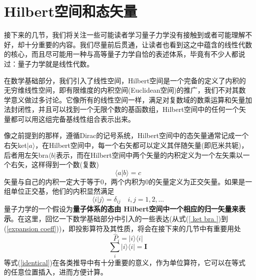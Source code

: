 \documentclass[12pt,a4paper,openany,twoside]{book}
\numberwithin{equation}{section}
\begin{document}
  \section{Hilbert空间和态矢量}
  接下来的几节，我们将关注一些可能读者学习量子力学没有接触到或者可能理解不好，却十分重要的内容。我们尽量前后贯通，让读者也看到这之中蕴含的线性代数的核心，而且尽可能用一种与高等量子力学自恰的表述体系，毕竟有不少人都说过：量子力学就是线性代数。

  在数学基础部分，我们引入了线性空间，Hilbert空间是一个完备的定义了内积的无穷维线性空间，即有限维度的内积空间(Euclidean空间)的推广，我们不对其数学意义做过多讨论。它像所有的线性空间一样，满足对复数域的数乘运算和矢量加法封闭性，并且可以找到一个无限个数的基函数组，Hilbert空间中的任何一个矢量都可以用这组完备基线性组合表示出来。

  像之前提到的那样，遵循Dirac的记号系统，Hilbert空间中的态矢量通常记成一个右矢ket$ | a \rangle $，在Hilbert空间中，每一个右矢都可以定义其伴随矢量(即厄米共轭)，后者用左矢bra$ \langle b | $表示，而在Hilbert空间中两个矢量的内积定义为一个左矢乘以一个右矢，这样得到一个数(复数)
  \begin{equation}
    \langle a | b\rangle= c
    \label{inner product}
  \end{equation}
  矢量与自己的内积一定大于等于0，两个内积为0的矢量定义为正交矢量。如果是一组单位正交基，他们的内积显然满足
  \begin{equation}
    \langle i | j\rangle=\delta_{i j} \quad i, j=1,2, \ldots
  \end{equation}
  量子力学的一个假设为\textbf{量子体系的态由 Hilbert空间中一个相应的归一矢量来表示}。在这里，回忆一下数学基础部分中引入的一些表达(从式(\ref{ ket bra })到(\ref{expansion coeff}))，即投影算符及其性质，将会在接下来的几节中有重要用处
  \begin{equation}
    \hat{P}_i= | i \rangle \langle i |
    \label{projection operator}
  \end{equation}
  \begin{equation}
    \sum_i | i \rangle \langle i | = \mathbf{I}
    \label{identical}
  \end{equation}
  等式(\ref{identical})在各类推导中有十分重要的意义，作为单位算符，它可以在等式的任意位置插入，进而方便计算。
\end{document}

